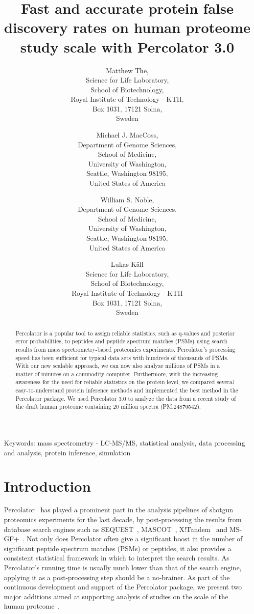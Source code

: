 \documentclass{article}
\title{Fast and accurate protein false discovery rates on human
proteome study scale with Percolator 3.0}
\author{Matthew The,\\
Science for Life Laboratory,\\
School of Biotechnology,\\
Royal Institute of Technology - KTH,\\
Box 1031, 17121 Solna,\\ Sweden
\and 
Michael J. MacCoss,\\
Department of Genome Sciences,\\
School of Medicine,\\
University of Washington,\\
Seattle, Washington 98195,\\ United States of America
\and 
William S. Noble,\\
Department of Genome Sciences,\\
School of Medicine,\\
University of Washington,\\
Seattle, Washington 98195,\\ United States of America
\and
Lukas K\"{a}ll\\
Science for Life Laboratory,\\ School of Biotechnology,\\
Royal Institute of Technology - KTH\\ 
Box 1031, 17121 Solna,\\ Sweden}
\begin{document}
\maketitle

\doublespacing

Keywords: mass spectrometry - LC-MS/MS, statistical analysis, 
data processing and analysis, protein inference, simulation


\newpage

\begin{abstract} 
Percolator is a popular tool to assign reliable statistics, such as
q-values and posterior error probabilities, to peptides and peptide
spectrum matches (PSMs) using search results from mass
spectrometry-based proteomics experiments. Percolator's processing
speed has been sufficient for typical data sets with hundreds of
thousands of PSMs. With our new scalable approach, we can now also
analyze millions of PSMs in a matter of minutes on a commodity
computer. Furthermore, with the increasing awareness for the need for
reliable statistics on the protein level, we compared several
easy-to-understand protein inference methods and implemented the best
method in the Percolator package. We used Percolator 3.0 to analyze
the data from a recent study of the draft human proteome containing 20
million spectra (PM:24870542).
\end{abstract}

\newpage

\section*{Introduction}

Percolator~\cite{kall2007} has played a prominent part in the analysis
pipelines of shotgun proteomics experiments for the last decade, by
post-processing the results from database search engines such as
SEQUEST~\cite{eng1994}, MASCOT~\cite{cottrell1999},
X!Tandem~\cite{craig2004tandem} and MS-GF+~\cite{kim2008}. Not only
does Percolator often give a significant boost in the number of
significant peptide spectrum matches (PSMs) or peptides, it also
provides a consistent statistical framework in which to interpret the
search results. As Percolator's running time is usually much lower
than that of the search engine, applying it as a post-processing step
should be a no-brainer. As part of the continuous development and
support of the Percolator package, we present two major additions
aimed at supporting analysis of studies on the scale of the human
proteome~\cite{kim2014draft, wilhelm2014mass}.
\end{document}
